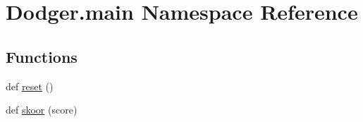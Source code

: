 \hypertarget{namespace_dodger_1_1main}{}\section{Dodger.\+main Namespace Reference}
\label{namespace_dodger_1_1main}
\subsection*{Functions}
\begin{DoxyCompactItemize}
\item 
def \hyperlink{namespace_dodger_1_1main_a4c06079e7a33bf58a26e3bcab04c612d}{reset} ()
\item 
def \hyperlink{namespace_dodger_1_1main_ad002f84c7d1646af7ac367a665eec672}{skoor} (score)
\end{DoxyCompactItemize}
